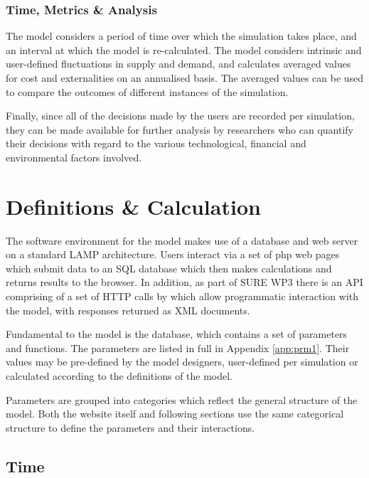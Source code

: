 \documentclass[notitlepage,a4paper]{article}
\begin{document}
\subsubsection{Time, Metrics \& Analysis}

The model considers a period of time over which the simulation takes place, and an interval at which the model is re-calculated.  The model considers intrinsic and user-defined fluctuations in supply and demand, and calculates averaged values for cost and externalities on an annualised basis. The averaged values can be used to compare the outcomes of different instances of the simulation. 

Finally, since all of the decisions made by the users are recorded per simulation, they can be made available for further analysis by researchers who can quantify their decisions with regard to the various technological, financial and environmental factors involved.


\section{Definitions \& Calculation}

The software environment for the model makes use of a database and web server on a standard LAMP architecture.  Users interact via a set of php web pages which submit data to an SQL database which then makes calculations and returns results to the browser.  In addition, as part of SURE WP3 there is an API comprising of a set of HTTP calls by which allow programmatic interaction with the model, with responses returned as XML documents.

Fundamental to the model is the database, which contains a set of parameters and functions.  The parameters are listed in full in Appendix \ref{app:prm1}. Their values may be pre-defined by the model designers, user-defined per simulation or calculated according to the definitions of the model.  

Parameters are grouped into categories which reflect the general structure of the model. Both the website itself and following sections use the same categorical structure to define the parameters and their interactions.

\subsection{Time}
\label{sec:time}
\end{document}
